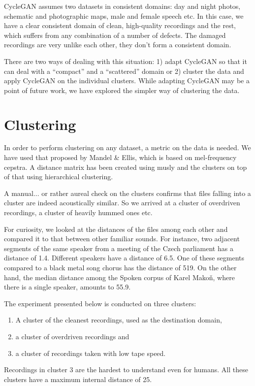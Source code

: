 \documentclass[runningheads]{llncs}
\begin{document}
CycleGAN assumes two datasets in consistent domains: day and night photos,
schematic and photographic maps, male and female speech etc. In this case,
we have a clear consistent domain of clean, high-quality recordings and the
rest, which suffers from any combination of a number of defects. The damaged
recordings are very unlike each other, they don't form a consistent domain.

There are two ways of dealing with this situation: 1) adapt CycleGAN so that it
can deal with a ``compact'' and a ``scattered'' domain or 2) cluster the
data and apply CycleGAN on the individual clusters. While adapting CycleGAN may be a
point of future work, we have explored the simpler way of clustering the data.

\section{Clustering}

In order to perform clustering on any dataset, a metric on the data is needed.
We have used that proposed by Mandel \& Ellis\cite{mandel2005song}, which
is based on mel-frequency cepstra. A distance matrix has been created using
musly and the clusters on top of that using
hierarchical clustering\cite{johnson1967hierarchical}.

A manual... or rather aureal check on the clusters confirms that files falling
into a cluster are indeed acoustically similar. So we arrived at a cluster of
overdriven recordings, a cluster of heavily hummed ones etc.

For curiosity, we looked at the distances of the files among each other and
compared it to that between other familiar sounds. For instance, two adjacent
segments of the same speaker from a meeting of the Czech parliament has a
distance of 1.4. Different speakers have a distance of 6.5. One of these
segments compared to a black metal song chorus has the distance of 519. On the
other hand, the median distance among the Spoken corpus of Karel Makoň, where
there is a single speaker, amounts to 55.9.

The experiment presented below is conducted on three clusters:
\begin{enumerate}
\item{A cluster of the cleanest recordings, used as the destination domain,}
\item{a cluster of overdriven recordings and}
\item{a cluster of recordings taken with low tape speed.}
\end{enumerate}
Recordings in cluster 3 are the hardest to understand even for humans. All these
clusters have a maximum internal distance of 25.
\end{document}
